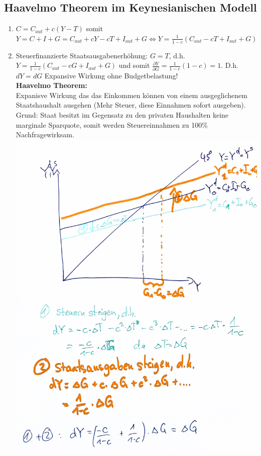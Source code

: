 \documentclass{scrartcl}
\begin{document}
\subsection{Haavelmo Theorem im Keynesianischen Modell}
\begin{enumerate}
  \item $C=C_{aut}+c(Y-T)$ somit $Y=C+I+G=C_{aut}+cY-cT + I_{aut} + G \Leftrightarrow Y = \frac{1}{1-c}(C_{aut}-cT + I_{aut}+G)$
  \item Steuerfinanzierte Staatsausgabenerh\"{o}hung: $G=T$, d.h.
  $Y = \frac{1}{1-c}(C_{aut}-cG + I_{aut}+G)$ und somit $\frac{\partial Y}{\partial G}=\frac{1}{1-c} (1-c) = 1$. D.h. $dY=dG$ Expansive Wirkung ohne Budgetbelastung!\\ \textbf{Haavelmo Theorem:}\\
  Expanisve Wirkung das das Einkommen k\"{o}nnen von einem ausgeglichenem Staatshaushalt ausgehen (Mehr Steuer, diese Einnahmen sofort ausgeben). Grund: Staat besitzt im Gegensatz zu den privaten Haushalten keine marginale Sparquote, somit werden Steuereinnahmen zu 100\% Nachfragewirksam.\\
  \includegraphics[width=.75\textwidth]{Bilder/Keynes_Haavelmo.pdf}
\end{enumerate}
\end{document}
